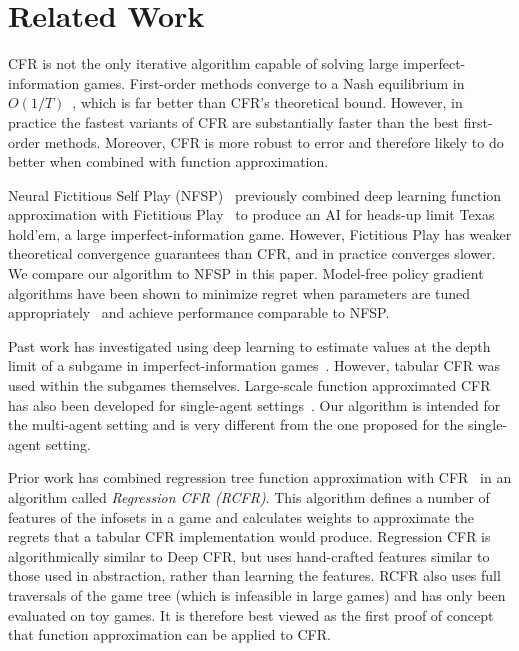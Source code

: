 \documentclass{article}
\begin{document}

\section{Related Work}
\vspace{-0.03in}
CFR is not the only iterative algorithm capable of solving large imperfect-information games. First-order methods converge to a Nash equilibrium in $O(1/T)$~\cite{Hoda10:Smoothing,Kroer18:Faster,Kroer18:Solving}, which is far better than CFR's theoretical bound. However, in practice the fastest variants of CFR are substantially faster than the best first-order methods. Moreover, CFR is more robust to error and therefore likely to do better when combined with function approximation. 

Neural Fictitious Self Play (NFSP)~\cite{Heinrich16:Deep} previously combined deep learning function approximation with Fictitious Play~\cite{Brown51:Iterative} to produce an AI for heads-up limit Texas hold'em, a large imperfect-information game. However, Fictitious Play has weaker theoretical convergence guarantees than CFR, and in practice converges slower. We compare our algorithm to NFSP in this paper. Model-free policy gradient algorithms have been shown to minimize regret when parameters are tuned appropriately~\cite{Srinivasan18:Actor} and achieve performance comparable to NFSP.

Past work has investigated using deep learning to estimate values at the depth limit of a subgame in imperfect-information games~\cite{Moravcik17:DeepStack,Brown18:Depth}. However, tabular CFR was used within the subgames themselves. Large-scale function approximated CFR has also been developed for single-agent settings~\cite{Jin17:Regret}. Our algorithm is intended for the multi-agent setting and is very different from the one proposed for the single-agent setting.

Prior work has combined regression tree function approximation with CFR~\cite{Waugh15:Solving} in an algorithm called \emph{Regression CFR (RCFR)}. This algorithm defines a number of features of the infosets in a game and calculates weights to approximate the regrets that a tabular CFR implementation would produce. Regression CFR is algorithmically similar to Deep CFR, but uses hand-crafted features similar to those used in abstraction, rather than learning the features. RCFR also uses full traversals of the game tree (which is infeasible in large games) and has only been evaluated on toy games. It is therefore best viewed as the first proof of concept that function approximation can be applied to CFR.
\end{document}
